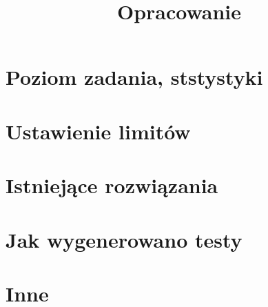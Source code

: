 \documentclass[12pt]{article}
\title{Opracowanie}
\date{} %
\begin{document}
\maketitle

\section{Poziom zadania, ststystyki}


\section{Ustawienie limitów}


\section{Istniejące rozwiązania}


\section{Jak wygenerowano testy}


\section{Inne}
\end{document}
